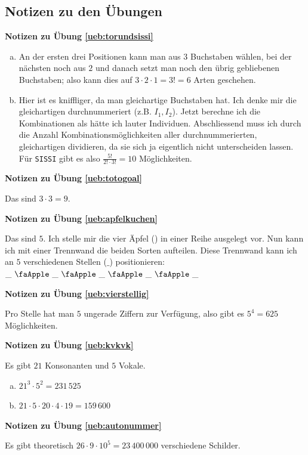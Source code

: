 \documentclass[%
<<<<<<< Updated upstream
<<<<<<< Updated upstream
11pt,%
twoside,%
titlepage,%
german,%
=======
=======
>>>>>>> Stashed changes
11pt,%
twoside,%
titlepage,%
swissgerman,%
<<<<<<< Updated upstream
>>>>>>> Stashed changes
=======
>>>>>>> Stashed changes
headsepline%
]{scrartcl}
\newcommand{\faReturnGray}{\textcolor{gray}{\faMailReply}} %
\theoremstyle{definition}
\theoremstyle{plain}
\newcommand{\concatueb}[1]{ueb:#1}%
\newcommand{\concatlsg}[1]{lsg:#1}%
\newenvironment{lsg}[1]{%
    \par\noindent\textbf{Notizen zu Übung \ref{\concatueb{#1}}}\label{\concatlsg{#1}}
    \hfill\hyperref[\concatueb{#1}]{\faReturnGray}\par %
}{%
    \par%
}
\newcounter{theo}[section]\setcounter{theo}{0}
\newcommand{\concatueb}[1]{ueb:#1}%
\newcommand{\concatlsg}[1]{lsg:#1}%
\newenvironment{lsg}[1]{%
    \par\noindent\textbf{Notizen zu Übung \ref{\concatueb{#1}}.}%
    \label{\concatlsg{#1}}
}{%
    \par%
}
\begin{document}
\clearpage

\clearpage

\subsection{Notizen zu den \"Ubungen}

\begin{lsg}{torundsissi}
\begin{enumerate}[a)]
\item An der ersten drei Positionen kann man aus $3$ Buchstaben w\"ahlen, bei der n\"achsten noch aus $2$ und danach setzt man noch den \"ubrig gebliebenen Buchstaben; also kann dies auf $3\cdot2\cdot1=3!=6$ Arten geschehen.
\item Hier ist es kniffliger, da man gleichartige Buchstaben hat. Ich denke mir die gleichartigen durchnummeriert (z.B. $I_{1}, I_{2}$). Jetzt berechne ich die Kombinationen als h\"atte ich lauter Individuen. Abschliessend muss ich durch die Anzahl Kombinationsm\"oglichkeiten aller durchnummerierten, gleichartigen dividieren, da sie sich ja eigentlich nicht unterscheiden lassen. F\"ur \texttt{SISSI} gibt es also $\frac{5!}{2!\cdot3!}=10$ M\"oglichkeiten.
\end{enumerate}
\end{lsg}
\begin{lsg}{totogoal}
Das sind $3\cdot3=9$.
\end{lsg}
\begin{lsg}{apfelkuchen}
Das sind $5$. Ich stelle mir die vier \"Apfel (\faApple) in einer Reihe ausgelegt vor. Nun kann ich mit einer Trennwand die beiden Sorten aufteilen. Diese Trennwand kann ich an $5$ verschiedenen Stellen ($\_$) positionieren:
$\_\ \text{\faApple}\ \_\ \text{\faApple}\ \_\ \text{\faApple}\ \_\ \text{\faApple}\ \_$
\end{lsg}
\begin{lsg}{vierstellig}
Pro Stelle hat man $5$ ungerade Ziffern zur Verf\"ugung, also gibt es $5^{4}=625$ M\"oglichkeiten.
\end{lsg}
\begin{lsg}{kvkvk}
Es gibt $21$ Konsonanten und $5$ Vokale.
\begin{enumerate}[a)]
\item $21^{3}\cdot5^{2}=231\,525$
\item $21\cdot5\cdot20\cdot4\cdot19=159\,600$
\end{enumerate}
\end{lsg}
\begin{lsg}{autonummer}
Es gibt theoretisch $26\cdot9\cdot10^{5}=23\,400\,000$ verschiedene Schilder.
\end{lsg}
\end{document}
